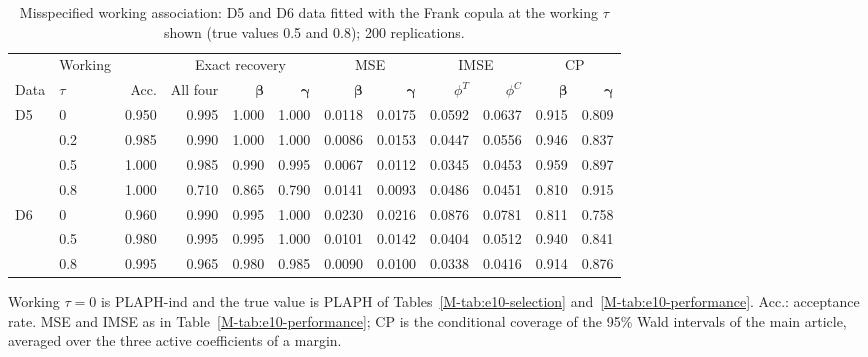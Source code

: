 \begin{table}[!htbp]
\centering
\caption{Misspecified working association: D5 and D6 data fitted with the Frank copula at the working \(\tau\) shown (true values 0.5 and 0.8); 200 replications.}
\label{tab:tau-misspec}
\begin{threeparttable}
\footnotesize
\setlength{\tabcolsep}{3pt}
\begin{tabular}{llrrrrrrrrrr}
\toprule
 & Working & & \multicolumn{3}{c}{Exact recovery} & \multicolumn{2}{c}{MSE} & \multicolumn{2}{c}{IMSE} & \multicolumn{2}{c}{CP} \\
\cmidrule(lr){4-6}\cmidrule(lr){7-8}\cmidrule(lr){9-10}\cmidrule(lr){11-12}
Data & \(\tau\) & Acc. & All four & \(\boldsymbol\beta\) & \(\boldsymbol\gamma\) & \(\boldsymbol\beta\) & \(\boldsymbol\gamma\) & \(\phi^T\) & \(\phi^C\) & \(\boldsymbol\beta\) & \(\boldsymbol\gamma\) \\
\midrule
D5 & 0 & 0.950 & 0.995 & 1.000 & 1.000 & 0.0118 & 0.0175 & 0.0592 & 0.0637 & 0.915 & 0.809 \\
 & 0.2 & 0.985 & 0.990 & 1.000 & 1.000 & 0.0086 & 0.0153 & 0.0447 & 0.0556 & 0.946 & 0.837 \\
 & 0.5 & 1.000 & 0.985 & 0.990 & 0.995 & 0.0067 & 0.0112 & 0.0345 & 0.0453 & 0.959 & 0.897 \\
 & 0.8 & 1.000 & 0.710 & 0.865 & 0.790 & 0.0141 & 0.0093 & 0.0486 & 0.0451 & 0.810 & 0.915 \\
\addlinespace
D6 & 0 & 0.960 & 0.990 & 0.995 & 1.000 & 0.0230 & 0.0216 & 0.0876 & 0.0781 & 0.811 & 0.758 \\
 & 0.5 & 0.980 & 0.995 & 0.995 & 1.000 & 0.0101 & 0.0142 & 0.0404 & 0.0512 & 0.940 & 0.841 \\
 & 0.8 & 0.995 & 0.965 & 0.980 & 0.985 & 0.0090 & 0.0100 & 0.0338 & 0.0416 & 0.914 & 0.876 \\
\bottomrule
\end{tabular}
\begin{tablenotes}[flushleft]
\footnotesize
\item Working \(\tau=0\) is PLAPH-ind and the true value is PLAPH of Tables~\ref{M-tab:e10-selection} and~\ref{M-tab:e10-performance}. Acc.: acceptance rate. MSE and IMSE as in Table~\ref{M-tab:e10-performance}; CP is the conditional coverage of the 95\% Wald intervals of the main article, averaged over the three active coefficients of a margin.
\end{tablenotes}
\end{threeparttable}
\end{table}
